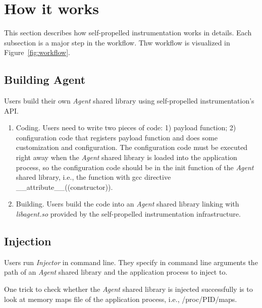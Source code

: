 \section{How it works}
This section describes how self-propelled instrumentation works in details.
Each subsection is a major step in the workflow.
Thw workflow is visualized in Figure~\ref{fig:workflow}.



\subsection{Building Agent}
Users build their own {\em Agent} shared library using self-propelled
instrumentation's API.
\begin{enumerate}
\item Coding. Users need to write two pieces of code: 1) payload function; 2)
  configuration code that registers payload function and does some customization
  and configuration. The configuration code must be executed right away when the
  {\em Agent} shared library is loaded into the application process, so the
  configuration code should be in the init function of the {\em Agent} shared
  library, i.e., the function with gcc directive
  \_\_attribute\_\_((constructor)).
\item Building. Users build the code into an {\em Agent} shared library linking
  with {\em libagent.so} provided by the self-propelled instrumentation
  infrastructure.
\end{enumerate}

\subsection{Injection}
Users run {\em Injector} in command line. They specify in command line arguments
the path of an {\em Agent} shared library and the application process to inject
to.

One trick to check whether the {\em Agent} shared library is injected
successfully is to look at memory maps file of the application process, i.e.,
/proc/PID/maps.

